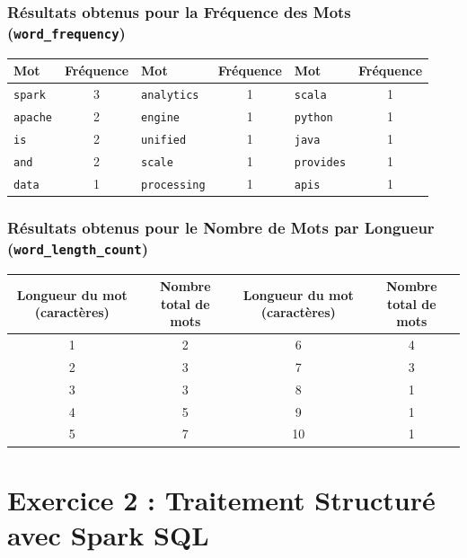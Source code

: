\documentclass[11pt,a4paper]{article}
\begin{document}
\subsubsection{Résultats obtenus pour la Fréquence des Mots (\texttt{word\_frequency})}
\begin{center}
\begin{tabular}{lc|lc|lc}
\toprule
\textbf{Mot} & \textbf{Fréquence} & \textbf{Mot} & \textbf{Fréquence} & \textbf{Mot} & \textbf{Fréquence} \\
\midrule
\texttt{spark}      & 3 & \texttt{analytics}  & 1 & \texttt{scala}      & 1 \\
\texttt{apache}     & 2 & \texttt{engine}     & 1 & \texttt{python}     & 1 \\
\texttt{is}         & 2 & \texttt{unified}    & 1 & \texttt{java}       & 1 \\
\texttt{and}        & 2 & \texttt{scale}      & 1 & \texttt{provides}   & 1 \\
\texttt{data}       & 1 & \texttt{processing} & 1 & \texttt{apis}       & 1 \\
\bottomrule
\end{tabular}
\end{center}

\subsubsection{Résultats obtenus pour le Nombre de Mots par Longueur (\texttt{word\_length\_count})}
\begin{center}
\begin{tabular}{cc|cc}
\toprule
\textbf{Longueur du mot (caractères)} & \textbf{Nombre total de mots} & \textbf{Longueur du mot (caractères)} & \textbf{Nombre total de mots} \\
\midrule
1  & 2 & 6  & 4 \\
2  & 3 & 7  & 3 \\
3  & 3 & 8  & 1 \\
4  & 5 & 9  & 1 \\
5  & 7 & 10 & 1 \\
\bottomrule
\end{tabular}
\end{center}

\section{Exercice 2 : Traitement Structuré avec Spark SQL}
\end{document}
